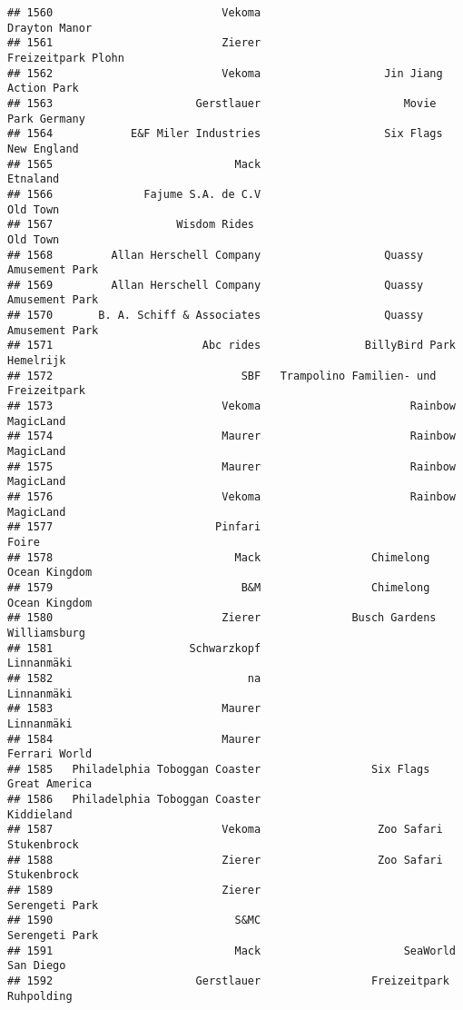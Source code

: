 \documentclass[
]{article}
\begin{document}
\begin{verbatim}
## 1560                          Vekoma                           Drayton Manor
## 1561                          Zierer                      Freizeitpark Plohn
## 1562                          Vekoma                   Jin Jiang Action Park
## 1563                      Gerstlauer                      Movie Park Germany
## 1564            E&F Miler Industries                   Six Flags New England
## 1565                            Mack                                Etnaland
## 1566              Fajume S.A. de C.V                                Old Town
## 1567                   Wisdom Rides                                 Old Town
## 1568         Allan Herschell Company                   Quassy Amusement Park
## 1569         Allan Herschell Company                   Quassy Amusement Park
## 1570       B. A. Schiff & Associates                   Quassy Amusement Park
## 1571                       Abc rides                BillyBird Park Hemelrijk
## 1572                             SBF   Trampolino Familien- und Freizeitpark
## 1573                          Vekoma                       Rainbow MagicLand
## 1574                          Maurer                       Rainbow MagicLand
## 1575                          Maurer                       Rainbow MagicLand
## 1576                          Vekoma                       Rainbow MagicLand
## 1577                         Pinfari                                   Foire
## 1578                            Mack                 Chimelong Ocean Kingdom
## 1579                             B&M                 Chimelong Ocean Kingdom
## 1580                          Zierer              Busch Gardens Williamsburg
## 1581                     Schwarzkopf                              Linnanmäki
## 1582                              na                              Linnanmäki
## 1583                          Maurer                              Linnanmäki
## 1584                          Maurer                           Ferrari World
## 1585   Philadelphia Toboggan Coaster                 Six Flags Great America
## 1586   Philadelphia Toboggan Coaster                              Kiddieland
## 1587                          Vekoma                  Zoo Safari Stukenbrock
## 1588                          Zierer                  Zoo Safari Stukenbrock
## 1589                          Zierer                          Serengeti Park
## 1590                            S&MC                          Serengeti Park
## 1591                            Mack                      SeaWorld San Diego
## 1592                      Gerstlauer                 Freizeitpark Ruhpolding

\end{verbatim}
\end{document}
